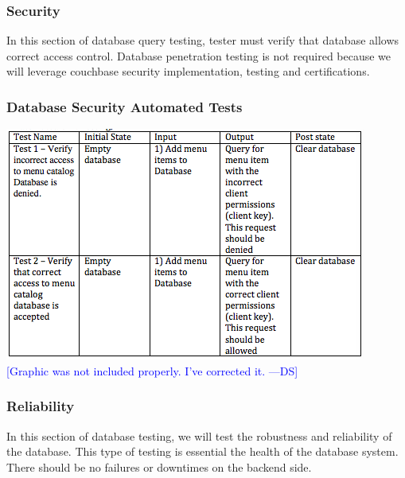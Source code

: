 \documentclass[12pt]{article}
\newcommand{\authornote}[3]{\textcolor{#1}{[#3 ---#2]}}
\newcommand{\authornote}[3]{}
\newcommand{\ds}[1]{\authornote{blue}{DS}{#1}}
\begin{document}
\subsubsection{Security}
In this section of database query testing, tester must verify that database allows correct access control. Database penetration testing is not required because we will leverage couchbase security implementation, testing and certifications.
\subsubsection{Database Security Automated Tests }
\includegraphics[width=\textwidth,height=\textheight,keepaspectratio]{security_tests.png}
\ds{Graphic was not included properly. I've corrected it.}

\subsubsection{Reliability}
In this section of database testing, we will test the robustness and reliability of the database.  This type of testing is essential the health of the database system. There should be no failures or downtimes on the backend side. 
\end{document}
